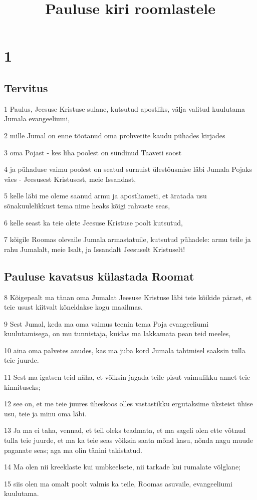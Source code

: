 

\title{Pauluse kiri roomlastele}

\chapter{1}

\section*{Tervitus}

\par 1 Paulus, Jeesuse Kristuse sulane, kutsutud apostliks, välja valitud kuulutama Jumala evangeeliumi,
\par 2 mille Jumal on enne tõotanud oma prohvetite kaudu pühades kirjades
\par 3 oma Pojast - kes liha poolest on sündinud Taaveti soost
\par 4 ja pühaduse vaimu poolest on seatud surnuist ülestõusmise läbi Jumala Pojaks väes - Jeesusest Kristusest, meie Issandast,
\par 5 kelle läbi me oleme saanud armu ja apostliameti, et äratada usu sõnakuulelikkust tema nime heaks kõigi rahvaste seas,
\par 6 kelle seast ka teie olete Jeesuse Kristuse poolt kutsutud,
\par 7 kõigile Roomas olevaile Jumala armastatuile, kutsutud pühadele: armu teile ja rahu Jumalalt, meie Isalt, ja Issandalt Jeesuselt Kristuselt!

\section*{Pauluse kavatsus külastada Roomat}

\par 8 Kõigepealt ma tänan oma Jumalat Jeesuse Kristuse läbi teie kõikide pärast, et teie usust kiitvalt kõneldakse kogu maailmas.
\par 9 Sest Jumal, keda ma oma vaimus teenin tema Poja evangeeliumi kuulutamisega, on mu tunnistaja, kuidas ma lakkamata pean teid meeles,
\par 10 aina oma palvetes anudes, kas ma juba kord Jumala tahtmisel saaksin tulla teie juurde.
\par 11 Sest ma igatsen teid näha, et võiksin jagada teile pisut vaimulikku annet teie kinnituseks;
\par 12 see on, et me teie juures üheskoos olles vastastikku ergutaksime üksteist ühise usu, teie ja minu oma läbi.
\par 13 Ja ma ei taha, vennad, et teil oleks teadmata, et ma sageli olen ette võtnud tulla teie juurde, et ma ka teie seas võiksin saata mõnd kasu, nõnda nagu muude paganate seas; aga ma olin tänini takistatud.
\par 14 Ma olen nii kreeklaste kui umbkeelsete, nii tarkade kui rumalate võlglane;
\par 15 siis olen ma omalt poolt valmis ka teile, Roomas asuvaile, evangeeliumi kuulutama.

